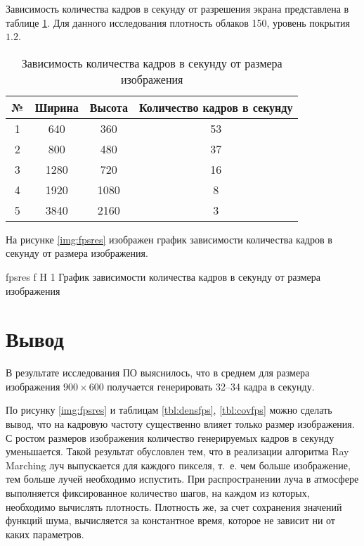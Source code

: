 Зависимость количества кадров в секунду от разрешения экрана представлена в таблице \ref{tbl:resfps}. Для данного исследования плотность облаков 150, уровень покрытия $1.2$.

\begin{table}[H]
	\begin{center}
		\begin{threeparttable}
			\captionsetup{justification=raggedright,singlelinecheck=off}
			\caption{Зависимость количества кадров в секунду от размера изображения}
			\label{tbl:resfps}
			\begin{tabular}{|c|c|c|c|}
				\hline
				№ & Ширина & Высота & Количество кадров в секунду \\
				\hline
				1 & 640 & 360 & 53 \\
				\hline
				2 & 800 & 480 & 37 \\
				\hline
				3 & 1280 & 720 & 16 \\
				\hline
				4 & 1920 & 1080 & 8 \\
				\hline
				5 & 3840 & 2160 & 3 \\
				\hline
			\end{tabular}
		\end{threeparttable}
	\end{center}
\end{table}

На рисунке \ref{img:fpsres} изображен график зависимости количества кадров в секунду от размера изображения.

{fpsres} %
{f} %
{H} %
{1\textwidth} %
{График зависимости количества кадров в секунду от размера изображения} %

\section*{Вывод}

В результате исследования ПО выяснилось, что в среднем для размера изображения $900 \times 600$ получается генерировать 32--34 кадра в секунду.

По рисунку \ref{img:fpsres} и таблицам \ref{tbl:densfps}, \ref{tbl:covfps} можно сделать вывод, что на кадровую частоту существенно влияет только размер изображения. 
С ростом размеров изображения количество генерируемых кадров в секунду уменьшается. Такой результат обусловлен тем, что в реализации алгоритма Ray Marching луч выпускается для каждого пикселя, т.~е. чем больше изображение, тем больше лучей необходимо испустить. При распространении луча в атмосфере выполняется фиксированное количество шагов, на каждом из которых, необходимо вычислять плотность. Плотность же, за счет сохранения значений функций шума, вычисляется за константное время, которое не зависит ни от каких параметров.